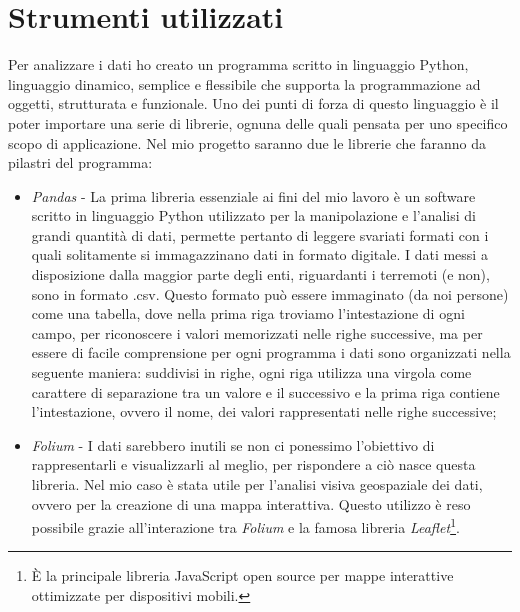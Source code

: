 \section{Strumenti utilizzati}\label{analisiDati}

Per analizzare i dati ho creato un programma scritto in linguaggio Python, linguaggio dinamico, semplice e flessibile che supporta la programmazione ad oggetti, strutturata e funzionale. Uno dei punti di forza di questo linguaggio \`e il poter importare una serie di librerie, ognuna delle quali pensata per uno specifico scopo di applicazione. Nel mio progetto saranno due le librerie che faranno da pilastri del programma:
\begin{itemize}
    \item \textit{Pandas} - La prima libreria essenziale ai fini del mio lavoro \`e un software scritto in linguaggio Python utilizzato per la manipolazione e l'analisi di grandi quantit\`a di dati, permette pertanto di leggere svariati formati con i quali solitamente si immagazzinano dati in formato digitale. I dati messi a disposizione dalla maggior parte degli enti, riguardanti i terremoti (e non), sono in formato .csv. Questo formato pu\`o essere immaginato (da noi persone) come una tabella, dove nella prima riga troviamo l'intestazione di ogni campo, per riconoscere i valori memorizzati nelle righe successive, ma per essere di facile comprensione per ogni programma i dati sono organizzati nella seguente maniera: suddivisi in righe, ogni riga utilizza una virgola come carattere di separazione tra un valore e il successivo e la prima riga contiene l'intestazione, ovvero il nome, dei valori rappresentati nelle righe successive;
    \item \textit{Folium} - I dati sarebbero inutili se non ci ponessimo l'obiettivo di rappresentarli e visualizzarli al meglio, per rispondere a ci\`o nasce questa libreria. Nel mio caso \`e stata utile per l'analisi visiva geospaziale dei dati, ovvero per la creazione di una mappa interattiva. Questo utilizzo \`e reso possibile grazie all'interazione tra \textit{Folium} e la famosa libreria \textit{Leaflet}\footnote{\`E la principale libreria JavaScript open source per mappe interattive ottimizzate per dispositivi mobili.}.
\end{itemize}